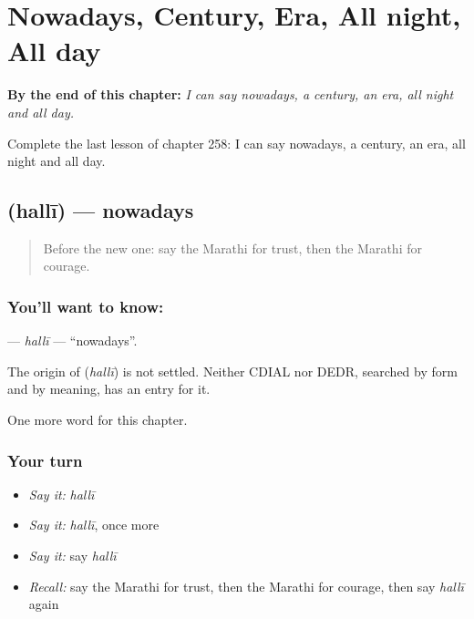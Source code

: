 
\chapter{Nowadays, Century, Era, All night, All day}
\label{ch:mr-nowadays-century-era-all-night-all-day}

\begin{chapteropening}
\textbf{By the end of this chapter:} \emph{I can say nowadays, a century, an era, all night and all day.}

Complete the last lesson of chapter 258: I can say nowadays, a century, an era, all night and all day.
\end{chapteropening}

\section[\texorpdfstring{\mr{हल्ली} (hallī)}{हल्ली (hallī)}]{ (hallī) — nowadays}

\label{lesson:MR-C258-halli}



\begin{quote}
Before the new one: say the Marathi for trust, then the Marathi for courage.
\end{quote}

\subsection*{You'll want to know: }
\textbf{} — \emph{hallī} — \textquotedblleft{}nowadays\textquotedblright{}.

\begin{cousinweb}
The origin of \textbf{} (\emph{hallī}) is not settled. Neither CDIAL nor DEDR, searched by form and by meaning, has an entry for it.
\end{cousinweb}

\begin{grammarlens}[title={What you've built}]
One more word for this chapter.
\end{grammarlens}

\subsection*{Your turn}
\begin{itemize}
\raggedright
  \item \emph{Say it:} \emph{hallī}
  \item \emph{Say it:} \emph{hallī}, once more
  \item \emph{Say it:} say \emph{hallī}
  \item \emph{Recall:} say the Marathi for trust, then the Marathi for courage, then say \emph{hallī} again
\end{itemize}

